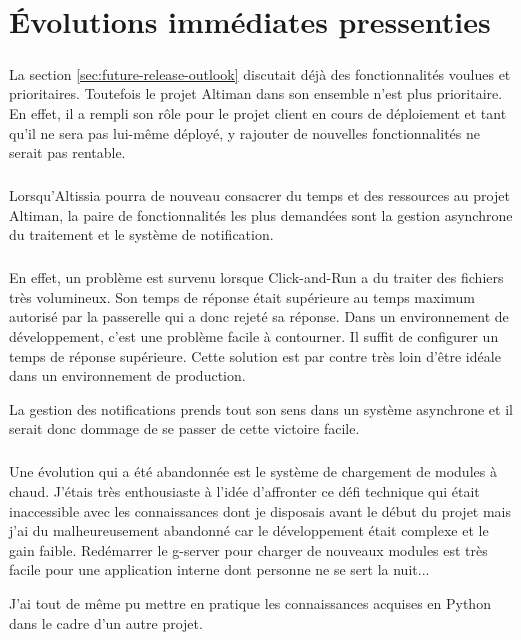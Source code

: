 \chapter{Évolutions immédiates pressenties}
\label{ch:next-steps}

\paragraph{}
La section \ref{sec:future-release-outlook} discutait déjà des fonctionnalités voulues et prioritaires.
Toutefois le projet Altiman dans son ensemble n'est plus prioritaire.
En effet, il a rempli son rôle pour le projet client en cours de déploiement et tant qu'il ne sera pas lui-même déployé,
y rajouter de nouvelles fonctionnalités ne serait pas rentable.

\paragraph{}
Lorsqu'Altissia pourra de nouveau consacrer du temps et des ressources au projet Altiman,
la paire de fonctionnalités les plus demandées sont la gestion asynchrone du traitement et le système de notification.

\paragraph{}
En effet, un problème est survenu lorsque Click-and-Run a du traiter des fichiers très volumineux.
Son temps de réponse était supérieure au temps maximum autorisé par la passerelle qui a donc rejeté sa réponse.
Dans un environnement de développement, c'est une problème facile à contourner.
Il suffit de configurer un temps de réponse supérieure.
Cette solution est par contre très loin d'être idéale dans un environnement de production.

La gestion des notifications prends tout son sens dans un système asynchrone et il serait donc dommage de se passer de cette victoire facile.

\paragraph{}
Une évolution qui a été abandonnée est le système de chargement de modules à chaud.
J'étais très enthousiaste à l'idée d'affronter ce défi technique qui était inaccessible avec les connaissances dont je disposais avant le début du projet mais j'ai du malheureusement abandonné car le développement était complexe et le gain faible.
Redémarrer le \gls{g-server} pour charger de nouveaux modules est très facile pour une application interne dont personne ne se sert la nuit...

J'ai tout de même pu mettre en pratique les connaissances acquises en Python dans le cadre d'un autre projet.
